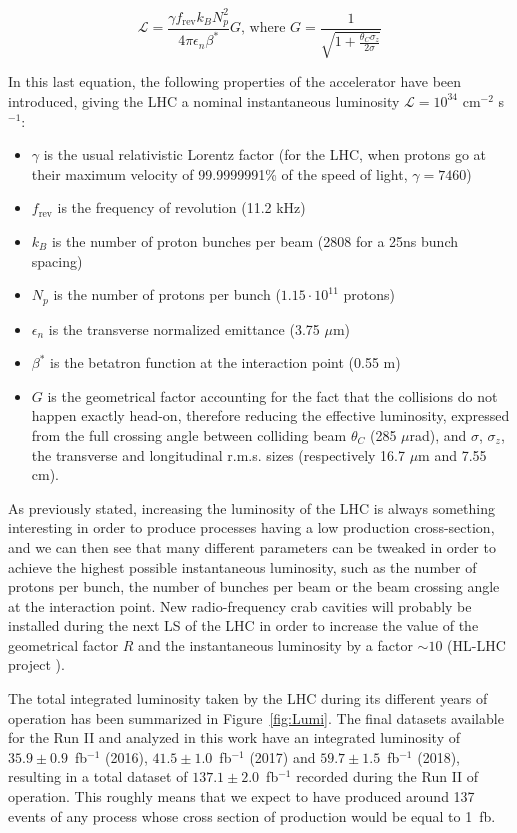 \documentclass[a4paper, 10pt, openright]{report}
\begin{document}
\begin{equation}
\label{eq:Luminosity}
\mathcal{L} = \frac{\gamma f_{\text{rev}} k_B N_p^2}{4 \pi \epsilon_n \beta^*}G \text{,  where } G = \frac{1}{\sqrt{1+\frac{\theta_C \sigma_z}{2 \sigma}}}
\end{equation}

In this last equation, the following properties of the accelerator have been introduced, giving the \ac{LHC} a nominal instantaneous luminosity $\mathcal{L} = 10^{34}$ cm$^{-2}$ s$^{-1}$:
\begin{itemize}
\item $\gamma$ is the usual relativistic Lorentz factor (for the \ac{LHC}, when protons go at their maximum velocity of 99.9999991\% of the speed of light, $\gamma = 7460$)
\item $f_{\text{rev}}$ is the frequency of revolution (11.2 kHz)
\item $k_B$ is the number of proton bunches per beam (2808 for a 25ns bunch spacing)
\item $N_p$ is the number of protons per bunch ($1.15 \cdot 10^{11}$ protons)
\item $\epsilon_n$ is the transverse normalized emittance (3.75 $\mu$m)
\item $\beta^*$ is the betatron function at the interaction point (0.55 m)
\item $G$ is the geometrical factor accounting for the fact that the collisions do not happen exactly head-on, therefore reducing the effective luminosity, expressed from the full crossing angle between colliding beam $\theta_C$ (285 $\mu$rad), and $\sigma$, $\sigma_z$, the transverse and longitudinal r.m.s. sizes (respectively 16.7 $\mu$m and 7.55 cm).
\end{itemize}

As previously stated, increasing the luminosity of the \ac{LHC} is always something interesting in order to produce processes having a low production cross-section, and we can then see that many different parameters can be tweaked in order to achieve the highest possible instantaneous luminosity, such as the number of protons per bunch, the number of bunches per beam or the beam crossing angle at the interaction point. New radio-frequency crab cavities will probably be installed during the next \ac{LS} of the \ac{LHC} in order to increase the value of the geometrical factor $R$ and the instantaneous luminosity by a factor $\sim 10$ (HL-LHC project \cite{HLLHC}).

The total integrated luminosity taken by the \ac{LHC} during its different years of operation has been summarized in Figure~\ref{fig:Lumi}. The final datasets available for the Run II and analyzed in this work have an integrated luminosity of $35.9 \pm 0.9$~fb$^{-1}$ (2016), $41.5 \pm 1.0$~fb$^{-1}$ (2017) and $59.7 \pm 1.5$~fb$^{-1}$ (2018), resulting in a total dataset of $137.1 \pm 2.0$~fb$^{-1}$ recorded during the Run II of operation. This roughly means that we expect to have produced around 137 events of any process whose cross section of production would be equal to 1~fb.
\end{document}
